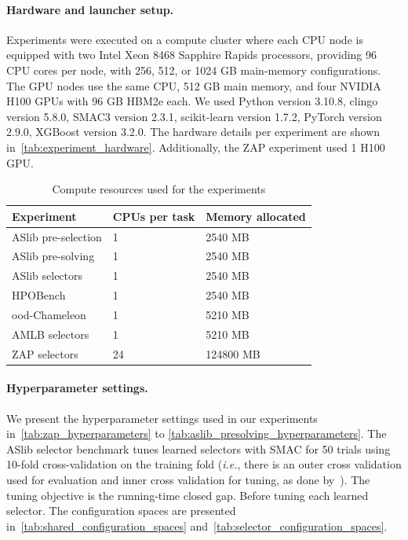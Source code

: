 \paragraph{Hardware and launcher setup.}
Experiments were executed on a compute cluster where each CPU node is equipped with two Intel Xeon 8468 Sapphire Rapids processors, providing 96 CPU cores per node, with 256, 512, or 1024 GB main-memory configurations. The GPU nodes use the same CPU, 512 GB main memory, and four NVIDIA H100 GPUs with 96 GB HBM2e each.
We used Python version 3.10.8, clingo version 5.8.0, SMAC3 version 2.3.1, scikit-learn version 1.7.2, PyTorch version 2.9.0, XGBoost version 3.2.0. The hardware details per experiment are shown in~\autoref{tab:experiment_hardware}. Additionally, the ZAP experiment used 1 H100 GPU.

\begin{table}[!htbp]
  \centering
  \caption[Compute resources]{Compute resources used for the experiments}
  \label{tab:experiment_hardware}
  \begin{tabular}{lll}
    \toprule
    Experiment &  CPUs per task & Memory allocated \\
    \midrule
    ASlib pre-selection & 1 & 2540 MB \\
    ASlib pre-solving & 1 & 2540 MB \\
    ASlib selectors & 1 & 2540 MB \\
    HPOBench & 1 & 2540 MB \\
    \Gls{ood}-Chameleon & 1 & 5210 MB  \\
    AMLB selectors &  1 & 5210 MB \\
    ZAP selectors  & 24 & 124800 MB \\
    \bottomrule
  \end{tabular}%
\end{table}

\paragraph{Hyperparameter settings.}
We present the hyperparameter settings used in our experiments in~\autoref{tab:zap_hyperparameters} to \autoref{tab:aslib_presolving_hyperparameters}.
The ASlib selector benchmark tunes learned selectors with SMAC for 50 trials using 10-fold cross-validation on the training fold (\emph{i.e.}, there is an outer cross validation used for evaluation and inner cross validation for tuning, as done by~\citealp{LinEtAl15}). The tuning objective is the running-time closed gap. Before tuning each learned selector. The configuration spaces are presented in~\autoref{tab:shared_configuration_spaces} and~\autoref{tab:selector_configuration_spaces}.

